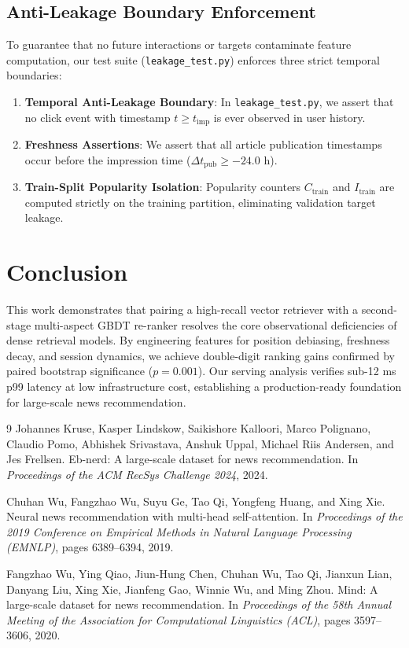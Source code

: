 \documentclass[11pt,a4paper]{article}
\begin{document}
\subsection{Anti-Leakage Boundary Enforcement}
To guarantee that no future interactions or targets contaminate feature computation, our test suite (\texttt{leakage\_test.py}) enforces three strict temporal boundaries:
\begin{enumerate}[leftmargin=1.8em, itemsep=2pt]
    \item \textbf{Temporal Anti-Leakage Boundary}: In \texttt{leakage\_test.py}, we assert that no click event with timestamp $t \ge t_{\text{imp}}$ is ever observed in user history.
    \item \textbf{Freshness Assertions}: We assert that all article publication timestamps occur before the impression time ($\Delta t_{\text{pub}} \ge -24.0\text{ h}$).
    \item \textbf{Train-Split Popularity Isolation}: Popularity counters $C_{\text{train}}$ and $I_{\text{train}}$ are computed strictly on the training partition, eliminating validation target leakage.
\end{enumerate}

\section{Conclusion}

This work demonstrates that pairing a high-recall vector retriever with a second-stage multi-aspect GBDT re-ranker resolves the core observational deficiencies of dense retrieval models. By engineering features for position debiasing, freshness decay, and session dynamics, we achieve double-digit ranking gains confirmed by paired bootstrap significance ($p=0.001$). Our serving analysis verifies sub-12 ms p99 latency at low infrastructure cost, establishing a production-ready foundation for large-scale news recommendation.

\begin{thebibliography}{9}
Johannes Kruse, Kasper Lindskow, Saikishore Kalloori, Marco Polignano, Claudio Pomo, Abhishek Srivastava, Anshuk Uppal, Michael Riis Andersen, and Jes Frellsen.
\newblock Eb-nerd: A large-scale dataset for news recommendation.
\newblock In \emph{Proceedings of the ACM RecSys Challenge 2024}, 2024.

Chuhan Wu, Fangzhao Wu, Suyu Ge, Tao Qi, Yongfeng Huang, and Xing Xie.
\newblock Neural news recommendation with multi-head self-attention.
\newblock In \emph{Proceedings of the 2019 Conference on Empirical Methods in Natural Language Processing (EMNLP)}, pages 6389--6394, 2019.

Fangzhao Wu, Ying Qiao, Jiun-Hung Chen, Chuhan Wu, Tao Qi, Jianxun Lian, Danyang Liu, Xing Xie, Jianfeng Gao, Winnie Wu, and Ming Zhou.
\newblock Mind: A large-scale dataset for news recommendation.
\newblock In \emph{Proceedings of the 58th Annual Meeting of the Association for Computational Linguistics (ACL)}, pages 3597--3606, 2020.
\end{thebibliography}
\end{document}
